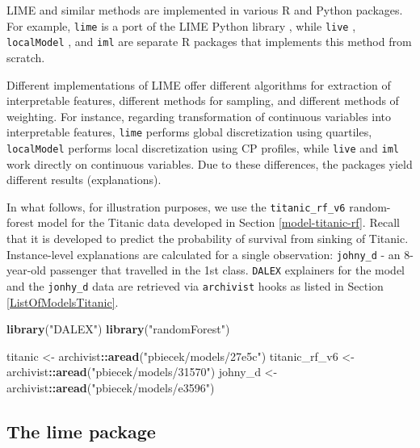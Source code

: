\documentclass[]{krantz}
\newenvironment{Shaded}{\begin{snugshade}}{\end{snugshade}}
\newcommand{\KeywordTok}[1]{\textcolor[rgb]{0.13,0.29,0.53}{\textbf{#1}}}
\newcommand{\NormalTok}[1]{#1}
\newcommand{\OperatorTok}[1]{\textcolor[rgb]{0.81,0.36,0.00}{\textbf{#1}}}
\newcommand{\StringTok}[1]{\textcolor[rgb]{0.31,0.60,0.02}{#1}}
\begin{document}
LIME and similar methods are implemented in various R and Python packages. For example, \texttt{lime} \citep{limePackage} is a port of the LIME Python library \citep{shapPackage}, while \texttt{live} \citep{R-live}, \texttt{localModel} \citep{localModelPackage}, and \texttt{iml} \citep{imlRPackage} are separate R packages that implements this method from scratch.

Different implementations of LIME offer different algorithms for extraction of interpretable features, different methods for sampling, and different methods of weighting. For instance, regarding transformation of continuous variables into interpretable features, \texttt{lime} performs global discretization using quartiles, \texttt{localModel} performs local discretization using CP profiles, while \texttt{live} and \texttt{iml} work directly on continuous variables.
Due to these differences, the packages yield different results (explanations).

In what follows, for illustration purposes, we use the \texttt{titanic\_rf\_v6} random-forest model for the Titanic data developed in Section \ref{model-titanic-rf}. Recall that it is developed to predict the probability of survival from sinking of Titanic. Instance-level explanations are calculated for a single observation: \texttt{johny\_d} - an 8-year-old passenger that travelled in the 1st class. \texttt{DALEX} explainers for the model and the \texttt{jonhy\_d} data are retrieved via \texttt{archivist} hooks as listed in Section \ref{ListOfModelsTitanic}.

\begin{Shaded}
\begin{Highlighting}[]
\KeywordTok{library}\NormalTok{(}\StringTok{"DALEX"}\NormalTok{)}
\KeywordTok{library}\NormalTok{(}\StringTok{"randomForest"}\NormalTok{)}

\NormalTok{titanic <-}\StringTok{ }\NormalTok{archivist}\OperatorTok{::}\KeywordTok{aread}\NormalTok{(}\StringTok{"pbiecek/models/27e5c"}\NormalTok{)}
\NormalTok{titanic_rf_v6 <-}\StringTok{ }\NormalTok{archivist}\OperatorTok{::}\KeywordTok{aread}\NormalTok{(}\StringTok{"pbiecek/models/31570"}\NormalTok{)}
\NormalTok{johny_d <-}\StringTok{ }\NormalTok{archivist}\OperatorTok{::}\KeywordTok{aread}\NormalTok{(}\StringTok{"pbiecek/models/e3596"}\NormalTok{)}
\end{Highlighting}
\end{Shaded}

\hypertarget{the-lime-package}{%
\subsection{The lime package}\label{the-lime-package}}
\end{document}
